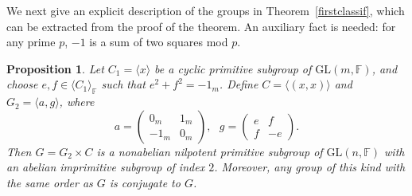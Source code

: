 \documentclass[12pt]{amsart}
\newtheorem{proposition}[theorem]{Proposition}
\theoremstyle{definition}
\theoremstyle{remark}
\begin{document}
 We next give an explicit description of 
 the groups in Theorem~\ref{firstclassif},
 which can
 be extracted from the proof of the theorem.
 An auxiliary fact is needed: for any prime 
 $p$, $-1$ is a sum of two squares mod $p$.
\begin{proposition}
 Let $C_1=\langle x \rangle$ be a cyclic primitive subgroup of 
 $\mathrm{GL}(m, \mathbb{F})$, and choose 
 $e , f \in  \langle C_1\rangle_\mathbb{F}$ such that
 $e^2+f^2=-1_m$. 
 Define $C = \langle (x, x)\rangle$ and 
 $G_2 = \langle a, g\rangle$, 
 where
$$a =\left( \begin{array}{rr}
0_m & 1_m \\
-1_m & 0_m 
\end{array} \right) , \ \ \ g = \left( \begin{array}{lrc}
e & f \\
f & -e 
\end{array} \right) .
$$
 Then $G = G_2 \times C$ is a nonabelian nilpotent 
 primitive subgroup of $\mathrm{GL}(n, \mathbb{F})$
 with an abelian imprimitive subgroup of index $2$.
 Moreover, any group of this kind with the 
 same order as $G$ is conjugate to $G$.
\end{proposition}
\end{document}
